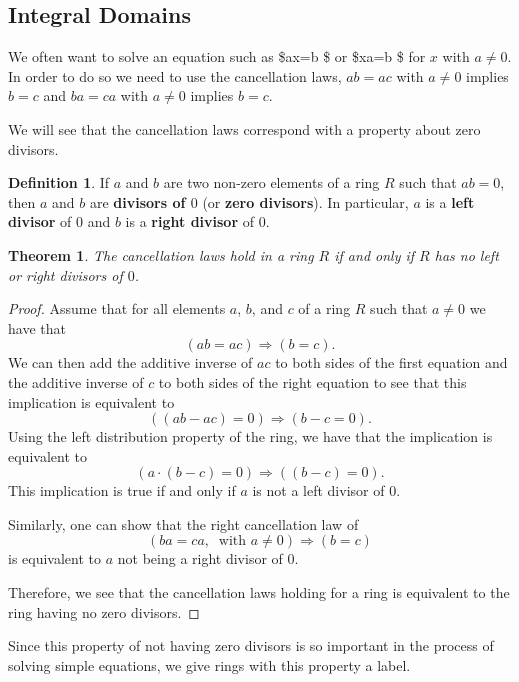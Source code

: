 \documentclass[
]{book}
\newtheorem{theorem}{Theorem}[chapter]
\theoremstyle{definition}
\newtheorem{definition}{Definition}[chapter]
\theoremstyle{definition}
\theoremstyle{definition}
\theoremstyle{definition}
\theoremstyle{remark}
\begin{document}
\hypertarget{integral-domains}{%
\subsection{Integral Domains}\label{integral-domains}}

We often want to solve an equation such as \$ax=b \$ or \$xa=b \$ for \(x\) with \(a\neq 0\). In order to do so we need to use the cancellation laws, \(ab=ac\) with \(a \neq 0\) implies \(b=c\) and \(ba=ca\) with \(a\neq 0\) implies \(b=c\).

We will see that the cancellation laws correspond with a property about zero divisors.

\begin{definition}
If \(a\) and \(b\) are two non-zero elements of a ring \(R\) such that \(ab=0\), then \(a\) and \(b\) are \textbf{divisors of \(0\)} (or \textbf{zero divisors}). In particular, \(a\) is a \textbf{left divisor} of \(0\) and \(b\) is a \textbf{right divisor} of \(0\).
\end{definition}

\begin{theorem}
The cancellation laws hold in a ring \(R\) if and only if \(R\) has no left or right divisors of \(0\).
\end{theorem}

\begin{proof}
Assume that for all elements \(a\), \(b\), and \(c\) of a ring \(R\) such that \(a\neq 0\) we have that
\[(ab=ac) \Rightarrow (b=c).\] We can then add the additive inverse of \(ac\) to both sides of the first equation and the additive inverse of \(c\) to both sides of the right equation to see that this implication is equivalent to \[\left((ab-ac)=0 \right) \Rightarrow (b-c=0).\] Using the left distribution property of the ring, we have that the implication is equivalent to \[\left( a \cdot (b-c) =0\right) \Rightarrow \left( (b-c)=0\right).\] This implication is true if and only if \(a\) is not a left divisor of \(0\).

Similarly, one can show that the right cancellation law of \[\left(ba=ca, \: \mbox{ with } a \neq 0 \right) \Rightarrow (b=c)\] is equivalent to \(a\) not being a right divisor of \(0\).

Therefore, we see that the cancellation laws holding for a ring is equivalent to the ring having no zero divisors.
\end{proof}

Since this property of not having zero divisors is so important in the process of solving simple equations, we give rings with this property a label.
\end{document}
